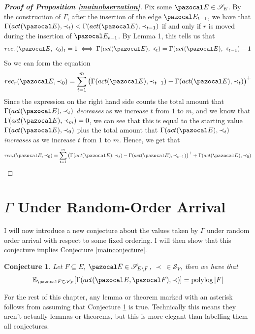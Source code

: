 \documentclass{report}
\newtheorem{conjecture}[theorem]{Conjecture}
\DeclareMathOperator*{\polylog}{polylog}
\begin{document}
\begin{proof}[\textbf{Proof of Proposition \ref{mainobservation}}]
Fix some $\pazocal E \in \mathcal S_E$. By the construction of $\Gamma$, after the insertion of the edge $\pazocal E_{t-1}$, we have that $\Gamma(act(\pazocal E), \prec_{t}) < \Gamma(act(\pazocal E), \prec_{t-1})$ if and only if $r$ is moved during the insertion of $\pazocal E_{t-1}$. By Lemma 1, this tells us that
\[ rec_r(\pazocal E, \prec_{0})_t = 1 \iff \Gamma(act(\pazocal E), \prec_{t}) = \Gamma(act(\pazocal E), \prec_{t-1}) - 1 \]
So we can form the equation
\[ rec_r(\pazocal E, \prec_0) =  \sum_{t=1}^{m}\big(\Gamma(act(\pazocal E), \prec_{t-1}) - \Gamma(act(\pazocal E), \prec_{t})\big)^+ \]
Since the expression on the right hand side counts the total amount that $\Gamma(act(\pazocal E), \prec_{t})$ \textit{decreases} as we increase $t$ from $1$ to $m$, and we know that $\Gamma(act(\pazocal E), \prec_{m}) = 0$, we can see that this is equal to the starting value $\Gamma(act(\pazocal E), \prec_0)$ plus the total amount that $\Gamma(act(\pazocal E), \prec_{t})$ \textit{increases} as we increase $t$ from $1$ to $m$. Hence, we get that
\[ rec_r(\pazocal E, \prec_0) =  \sum_{t=1}^{m}\big(\Gamma(act(\pazocal E), \prec_{t}) - \Gamma(act(\pazocal E), \prec_{t-1})\big)^+ + \Gamma(act(\pazocal E), \prec_0) \]
\end{proof}

\section{$\Gamma$ Under Random-Order Arrival}

I will now introduce a new conjecture about the values taken by $\Gamma$ under random order arrival with respect to some fixed ordering. I will then show that this conjecture implies Conjecture \ref{mainconjecture}.

\begin{conjecture}\label{finallemma}
Let $F \subseteq E$, $\pazocal E \in \mathcal S_{E \setminus F}$, $\prec \: \in \mathcal S_V$, then we have that
\[ \mathbb E_{\pazocal F \in \mathcal S_F}[\Gamma(act(\pazocal E, \pazocal F), \prec)] = \polylog{\vert F \vert} \]
\end{conjecture}

For the rest of this chapter, any lemma or theorem marked with an asterisk follows from assuming that Conjecture \ref{finallemma} is true. Technically this means they aren't actually lemmas or theorems, but this is more elegant than labelling them all conjectures.
\end{document}
